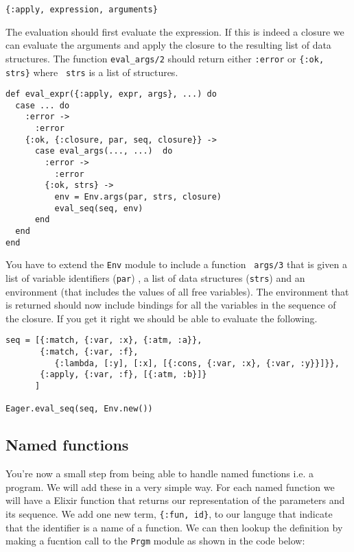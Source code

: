 \documentclass[a4paper,11pt]{article}
\begin{document}
\begin{verbatim}
{:apply, expression, arguments}
\end{verbatim}

The evaluation should first evaluate the expression. If this is indeed
a closure we can evaluate the arguments and apply the closure to the
resulting list of data structures. The function {\tt eval_args/2}
should return either {\tt :error} or {\tt \{:ok, strs\}} where {\tt
  strs} is a list of structures.

\begin{verbatim}
def eval_expr({:apply, expr, args}, ...) do
  case ... do
    :error ->
      :error
    {:ok, {:closure, par, seq, closure}} ->
      case eval_args(..., ...)  do
        :error ->
          :error
        {:ok, strs} ->
          env = Env.args(par, strs, closure)
          eval_seq(seq, env)
      end
  end
end
\end{verbatim}

You have to extend the {\tt Env} module to include a function {\tt
  args/3} that is given a list of variable identifiers ({\tt par}) , a
list of data structures ({\tt strs}) and an environment (that includes
the values of all free variables). The environment that is returned
should now include bindings for all the variables in the sequence of
the closure. If you get it right we should be able to evaluate the
following.

\begin{verbatim}
seq = [{:match, {:var, :x}, {:atm, :a}},
       {:match, {:var, :f}, 
          {:lambda, [:y], [:x], [{:cons, {:var, :x}, {:var, :y}}]}},
       {:apply, {:var, :f}, [{:atm, :b}]}
      ]
      
Eager.eval_seq(seq, Env.new())
\end{verbatim}

\subsection{Named functions}

You're now a small step from being able to handle named functions
i.e. a program. We will add these in a very simple way. For each named
function we will have a Elixir function that returns our
representation of the parameters and its sequence. We add one new
term, {\tt \{:fun, id\}}, to our languge that indicate that the
identifier is a name of a function. We can then lookup the definition
by making a fucntion call to the {\tt Prgm} module as shown in the code below:
\end{document}
